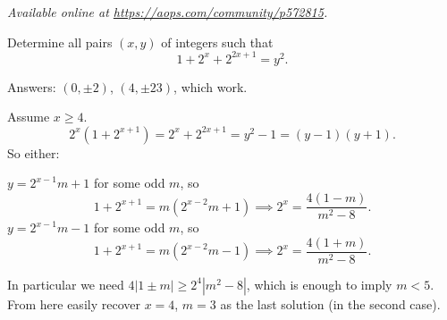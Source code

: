 \textsl{Available online at \url{https://aops.com/community/p572815}.}
\begin{mdframed}[style=mdpurplebox,frametitle={Problem statement}]
Determine all pairs $(x,y)$ of integers such that
\[ 1 + 2^x + 2^{2x+1} = y^2. \]
\end{mdframed}
Answers: $(0, \pm 2)$, $(4, \pm 23)$, which work.

Assume $x \ge 4$.
\[ 2^x \left( 1 + 2^{x+1} \right)
  = 2^x + 2^{2x+1} = y^2 - 1 = (y-1)(y+1). \]
So either:
\begin{itemize}
  \ii $y = 2^{x-1} m + 1$ for some odd $m$, so
  \[ 1 + 2^{x+1} = m\left( 2^{x-2}m+1 \right)
    \implies 2^x = \frac{4(1-m)}{m^2-8}. \]
  \ii $y = 2^{x-1} m - 1$ for some odd $m$, so
  \[ 1 + 2^{x+1} = m\left( 2^{x-2}m-1 \right)
    \implies 2^x = \frac{4(1+m)}{m^2-8}. \]
\end{itemize}
In particular we need $4|1 \pm m| \ge 2^4 |m^2-8|$,
which is enough to imply $m < 5$.
From here easily recover $x = 4$, $m = 3$ as the last solution
(in the second case).
\pagebreak